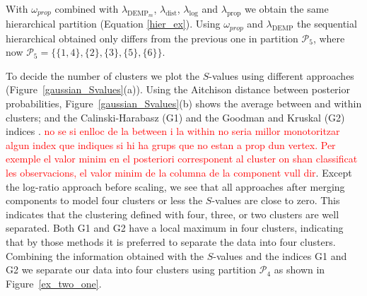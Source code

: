\documentclass[submit]{smj}
\theoremstyle{definition}
\begin{document}
With $\omega_{prop}$ combined with $\lambda_{\text{DEMP}_m}$, $\lambda_{\text{dist}}$, $\lambda_{\log}$ and $\lambda_{\text{prop}}$ we obtain the same hierarchical partition (Equation \ref{hier_ex}). Using $\omega_{prop}$ and $\lambda_{\text{DEMP}}$ the sequential hierarchical obtained only differs from the previous one  in partition $\mathcal{P}_5$, where now $\mathcal{P}_5 = \{\{1, 4\},\{2\}, \{3\},\{5\},\{6\} \}$.

To decide the number of clusters we plot the $S$-values using different approaches (Figure~\ref{gaussian_Svalues}(a)). Using the Aitchison distance between posterior probabilities, Figure~\ref{gaussian_Svalues}(b) shows the average between and within clusters; and the Calinski-Harabasz (G1) and the Goodman and Kruskal (G2) indices \citep{milligan1985}. \textcolor{red}{no se si enlloc de la between i la within no seria millor monotoritzar algun index que indiques si hi ha grups que no estan a prop dun vertex. Per exemple el valor minim en el posteriori corresponent al cluster on shan classificat les observacions, el valor minim de la columna de la component vull dir}. Except the log-ratio approach before scaling, we see that all approaches after merging components to model four clusters or less the $S$-values are close to zero. This indicates that the clustering defined with four, three, or two clusters are well separated. Both G1 and G2 have a local maximum in four clusters, indicating that by those methods it is preferred to separate the data into four clusters. Combining the information obtained with the $S$-values and the indices G1 and G2 we separate our data into four clusters using partition $\mathcal{P}_4$ as shown in Figure~\ref{ex_two_one}.
\end{document}
